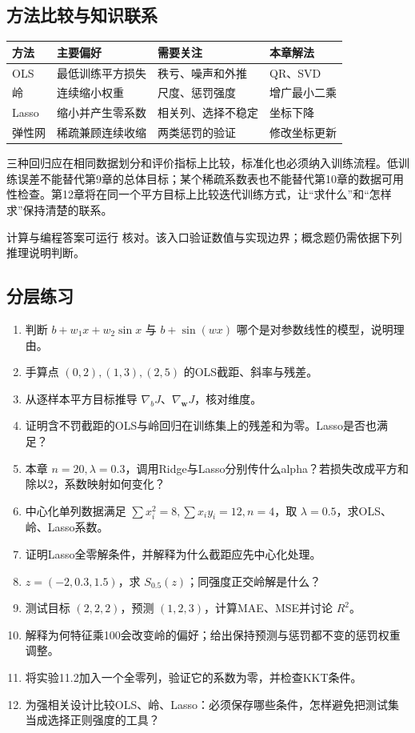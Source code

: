 \documentclass[UTF8,fontset=none,zihao=-4,a4paper]{ctexart}
\newcommand{\code}[1]{\texttt{\detokenize{#1}}}
\numberwithin{equation}{section}
\numberwithin{figure}{section}
\begin{document}
\subsection{方法比较与知识联系}
\begin{center}
\begin{tabularx}{\linewidth}{l Y Y Y}
\toprule
方法 & 主要偏好 & 需要关注 & 本章解法\\\midrule
OLS & 最低训练平方损失 & 秩亏、噪声和外推 & QR、SVD\\
岭 & 连续缩小权重 & 尺度、惩罚强度 & 增广最小二乘\\
Lasso & 缩小并产生零系数 & 相关列、选择不稳定 & 坐标下降\\
弹性网 & 稀疏兼顾连续收缩 & 两类惩罚的验证 & 修改坐标更新\\\bottomrule
\end{tabularx}
\end{center}
三种回归应在相同数据划分和评价指标上比较，标准化也必须纳入训练流程。低训练误差不能替代第9章的总体目标；某个稀疏系数表也不能替代第10章的数据可用性检查。第12章将在同一个平方目标上比较迭代训练方式，让“求什么”和“怎样求”保持清楚的联系。

计算与编程答案可运行 \code{ch11_solutions.py} 核对。该入口验证数值与实现边界；概念题仍需依据下列推理说明判断。

\subsection{分层练习}
\begin{enumerate}[label=11.\arabic*,before={\interlinepenalty=10000}]
\item 判断 $b+w_1x+w_2\sin x$ 与 $b+\sin(wx)$ 哪个是对参数线性的模型，说明理由。
\item 手算点 $(0,2),(1,3),(2,5)$ 的OLS截距、斜率与残差。
\item 从逐样本平方目标推导 $\nabla_bJ$、$\nabla_{\symbf w}J$，核对维度。
\item 证明含不罚截距的OLS与岭回归在训练集上的残差和为零。Lasso是否也满足？
\item 本章 $n=20,\lambda=0.3$，调用Ridge与Lasso分别传什么alpha？若损失改成平方和除以2，系数映射如何变化？
\item 中心化单列数据满足 $\sum x_i^2=8,\sum x_iy_i=12,n=4$，取 $\lambda=0.5$，求OLS、岭、Lasso系数。
\item 证明Lasso全零解条件，并解释为什么截距应先中心化处理。
\item $z=(-2,0.3,1.5)$，求 $S_{0.5}(z)$；同强度正交岭解是什么？
\item 测试目标 $(2,2,2)$，预测 $(1,2,3)$，计算MAE、MSE并讨论 $R^2$。
\item 解释为何特征乘100会改变岭的偏好；给出保持预测与惩罚都不变的惩罚权重调整。
\item 将实验11.2加入一个全零列，验证它的系数为零，并检查KKT条件。
\item 为强相关设计比较OLS、岭、Lasso：必须保存哪些条件，怎样避免把测试集当成选择正则强度的工具？
\end{enumerate}
\end{document}

